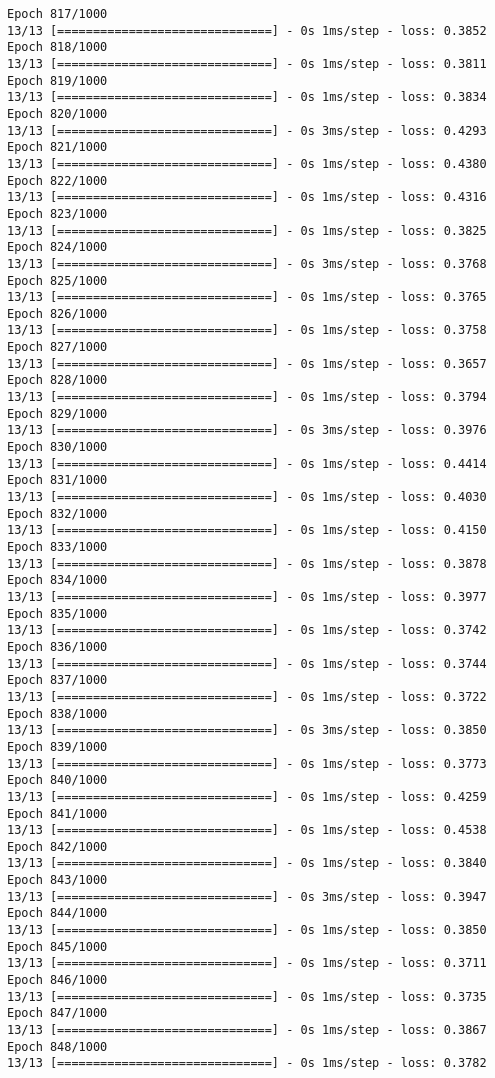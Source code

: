 \documentclass[11pt]{article}
\begin{document}
\begin{Verbatim}[commandchars=\\\{\}]
Epoch 817/1000
13/13 [==============================] - 0s 1ms/step - loss: 0.3852
Epoch 818/1000
13/13 [==============================] - 0s 1ms/step - loss: 0.3811
Epoch 819/1000
13/13 [==============================] - 0s 1ms/step - loss: 0.3834
Epoch 820/1000
13/13 [==============================] - 0s 3ms/step - loss: 0.4293
Epoch 821/1000
13/13 [==============================] - 0s 1ms/step - loss: 0.4380
Epoch 822/1000
13/13 [==============================] - 0s 1ms/step - loss: 0.4316
Epoch 823/1000
13/13 [==============================] - 0s 1ms/step - loss: 0.3825
Epoch 824/1000
13/13 [==============================] - 0s 3ms/step - loss: 0.3768
Epoch 825/1000
13/13 [==============================] - 0s 1ms/step - loss: 0.3765
Epoch 826/1000
13/13 [==============================] - 0s 1ms/step - loss: 0.3758
Epoch 827/1000
13/13 [==============================] - 0s 1ms/step - loss: 0.3657
Epoch 828/1000
13/13 [==============================] - 0s 1ms/step - loss: 0.3794
Epoch 829/1000
13/13 [==============================] - 0s 3ms/step - loss: 0.3976
Epoch 830/1000
13/13 [==============================] - 0s 1ms/step - loss: 0.4414
Epoch 831/1000
13/13 [==============================] - 0s 1ms/step - loss: 0.4030
Epoch 832/1000
13/13 [==============================] - 0s 1ms/step - loss: 0.4150
Epoch 833/1000
13/13 [==============================] - 0s 1ms/step - loss: 0.3878
Epoch 834/1000
13/13 [==============================] - 0s 1ms/step - loss: 0.3977
Epoch 835/1000
13/13 [==============================] - 0s 1ms/step - loss: 0.3742
Epoch 836/1000
13/13 [==============================] - 0s 1ms/step - loss: 0.3744
Epoch 837/1000
13/13 [==============================] - 0s 1ms/step - loss: 0.3722
Epoch 838/1000
13/13 [==============================] - 0s 3ms/step - loss: 0.3850
Epoch 839/1000
13/13 [==============================] - 0s 1ms/step - loss: 0.3773
Epoch 840/1000
13/13 [==============================] - 0s 1ms/step - loss: 0.4259
Epoch 841/1000
13/13 [==============================] - 0s 1ms/step - loss: 0.4538
Epoch 842/1000
13/13 [==============================] - 0s 1ms/step - loss: 0.3840
Epoch 843/1000
13/13 [==============================] - 0s 3ms/step - loss: 0.3947
Epoch 844/1000
13/13 [==============================] - 0s 1ms/step - loss: 0.3850
Epoch 845/1000
13/13 [==============================] - 0s 1ms/step - loss: 0.3711
Epoch 846/1000
13/13 [==============================] - 0s 1ms/step - loss: 0.3735
Epoch 847/1000
13/13 [==============================] - 0s 1ms/step - loss: 0.3867
Epoch 848/1000
13/13 [==============================] - 0s 1ms/step - loss: 0.3782

\end{Verbatim}
\end{document}
